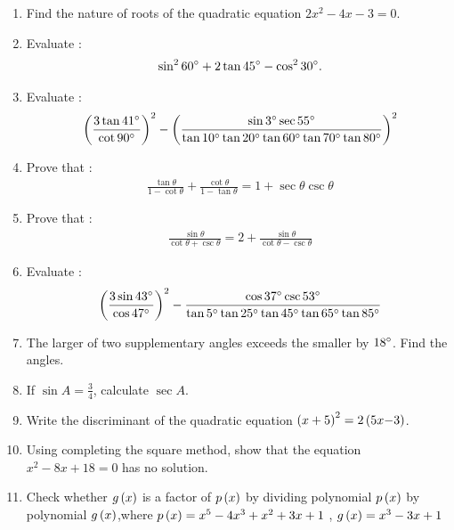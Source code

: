 \begin{enumerate}
\item Find the nature of roots of the quadratic equation $2x^2-4x-3=0$.

\item Evaluate :
 \begin{align*}
	     \sin^{2}{60\degree} + 2\tan{45\degree} - \cos^{2}{30\degree}. 
      \end{align*}

\item Evaluate :
\begin{align*}
\left(\frac{3\tan 41\degree}{\cot 90\degree}\right)^2 - \left(\frac{\sin 3\degree \sec 55\degree}{\tan 10\degree \tan 20\degree \tan 60\degree \tan 70\degree \tan 80\degree}\right)^2
\end{align*}

\item Prove that :
\begin{align*}
\frac{\tan \theta}{1-\cot \theta} + \frac{\cot \theta}{1- \tan \theta} = 1+ \sec \theta  \csc  \theta   
\end{align*}

\item Prove that :
\begin{align*}
    \frac{\sin \theta}{\cot \theta + \csc \theta} = 2 + \frac{\sin \theta}{\cot \theta - \csc \theta}
\end{align*}

\item Evaluate :
\begin{align*}
\left(\frac{3\sin 43\degree}{\cos 47\degree}\right)^2 - \frac{\cos 37\degree \csc 53\degree}{\tan 5\degree \tan 25\degree \tan 45\degree \tan 65\degree \tan 85\degree}
\end{align*}

\item The larger of two supplementary angles exceeds the smaller by $18\degree$. Find the angles.

 \item If $\sin A = \frac{3}{4}$, calculate $\sec A$.

\item Write the discriminant of the quadratic equation $\left(x + 5\right)^2 = 2 \left(5x {-3}\right)$.

\item Using completing the square method, show that the equation
$x^2 - 8x + 18 = 0$ has no solution.

\item Check whether $g\left(x\right)$ is a factor of $p\left(x\right)$ by dividing polynomial $p\left(x\right)$ by polynomial $g\left(x\right)$,where $p\left(x\right) = x^5 - 4x^3 + x^2 + 3x + 1$ , $g\left(x\right) = x^3 - 3x + 1$


\end{enumerate}
